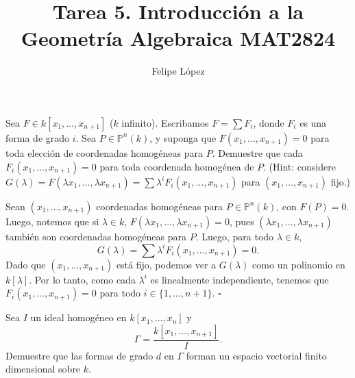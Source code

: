 \documentclass[12pt]{amsart}
\title{Tarea 5. Introducción a la Geometría Algebraica MAT2824}
\author{Felipe López}
\newenvironment{ejercicio}[1]{%
  \begin{trivlist}\item[\hskip\labelsep\textbf{Ejercicio #1.}]\itshape%
}{\end{trivlist}}
\newenvironment{dem}{%
  \begin{trivlist}\item[\hskip\labelsep\textit{Demostración:}]%
}{\hfill$\square$\end{trivlist}}
\begin{document}
\maketitle

\begin{ejercicio}{4.2}
Sea $F \in k[x_1, \ldots, x_{n+1}]$ ($k$ infinito). Escribamos $F = \sum F_i$, donde $F_i$ es una forma de grado $i$. Sea $P \in \mathbb{P}^n(k)$, y suponga que $F(x_1, \ldots, x_{n+1}) = 0$ para toda elección de coordenadas homogéneas para $P$. Demuestre que cada $F_i(x_1, \ldots, x_{n+1}) = 0$ para toda coordenada homogénea de $P$. (Hint: considere $G(\lambda) = F(\lambda x_1, \ldots, \lambda x_{n+1}) = \sum \lambda^i F_i(x_1, \ldots, x_{n+1})$ para $(x_1, \ldots, x_{n+1})$ fijo.)
\end{ejercicio}

\begin{dem}
Sean $(x_1, \ldots, x_{n+1})$ coordenadas homogéneas para $P \in \mathbb{P}^n(k)$, con $F(P) = 0$. Luego, notemos que si $\lambda \in k$, $F(\lambda x_1, \ldots, \lambda x_{n+1}) = 0$, pues $(\lambda x_1, \ldots, \lambda x_{n+1})$ también son coordenadas homogéneas para $P$. Luego, para todo $\lambda \in k$,
\[
	G(\lambda) = \sum \lambda^i F_i(x_1, \ldots, x_{n+1}) = 0.
\]
Dado que $(x_1, \ldots, x_{n+1})$ está fijo, podemos ver a $G(\lambda)$ como un polinomio en $k[\lambda]$. Por lo tanto, como cada $\lambda^i$ es linealmente independiente, tenemos que $F_i(x_1, \ldots, x_{n+1}) = 0$ para todo $i \in \{1, \ldots, n+1\}$.
\end{dem}

\medskip
\begin{ejercicio}{4.9}
Sea $I$ un ideal homogéneo en $k[x_1, \ldots, x_n]$ y
\[
  \Gamma = \frac{k[x_1, \ldots, x_{n+1}]}{I}.
\]
Demuestre que las formas de grado $d$ en $\Gamma$ forman un
espacio vectorial finito dimensional sobre $k$.
\end{ejercicio}
\end{document}
